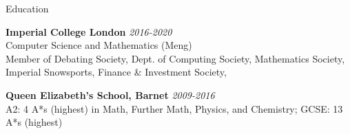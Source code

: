 \documentclass{resume} %
\begin{document}

\begin{rSection}{Education}

{\bf Imperial College London} \hfill {\em 2016-2020} \\ 
Computer Science and Mathematics (Meng)\smallskip\\
Member of Debating Society, Dept. of Computing Society, Mathematics Society, 
Imperial Snowsports, Finance \& Investment Society, 

{\bf Queen Elizabeth's School, Barnet} \hfill {\em 2009-2016} \\ 
A2: 4 A*s (highest) in Math, Further Math, Physics, and Chemistry; GCSE: 13 A*s (highest)

\end{rSection}

\end{document}
